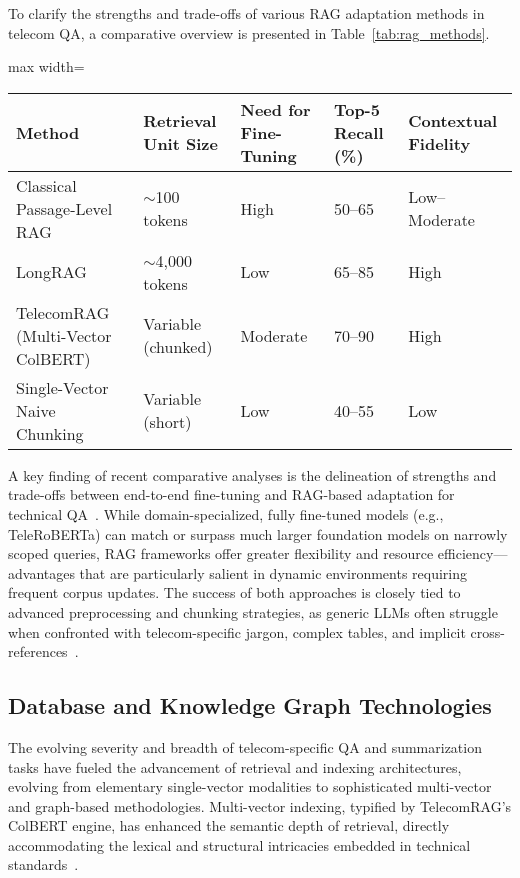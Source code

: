 \documentclass[sigconf]{acmart}
\begin{document}
To clarify the strengths and trade-offs of various RAG adaptation methods in telecom QA, a comparative overview is presented in Table~\ref{tab:rag_methods}.

\begin{table*}[htbp]
\centering
\caption{Comparative Properties of RAG Adaptation Strategies in Telecom Question Answering}
\label{tab:rag_methods}
\begin{adjustbox}{max width=\textwidth}
\begin{tabular}{lllll}
\toprule
\textbf{Method} & \textbf{Retrieval Unit Size} & \textbf{Need for Fine-Tuning} & \textbf{Top-5 Recall (\%)} & \textbf{Contextual Fidelity} \\
\midrule
Classical Passage-Level RAG & \(\sim\)100 tokens & High & 50--65 & Low--Moderate \\
LongRAG & \(\sim\)4,000 tokens & Low & 65--85 & High \\
TelecomRAG (Multi-Vector ColBERT) & Variable (chunked) & Moderate & 70--90 & High \\
Single-Vector Naive Chunking & Variable (short) & Low & 40--55 & Low \\
\bottomrule
\end{tabular}
\end{adjustbox}
\end{table*}

A key finding of recent comparative analyses is the delineation of strengths and trade-offs between end-to-end fine-tuning and RAG-based adaptation for technical QA~\cite{ref22,ref26}. While domain-specialized, fully fine-tuned models (e.g., TeleRoBERTa) can match or surpass much larger foundation models on narrowly scoped queries, RAG frameworks offer greater flexibility and resource efficiency---advantages that are particularly salient in dynamic environments requiring frequent corpus updates. The success of both approaches is closely tied to advanced preprocessing and chunking strategies, as generic LLMs often struggle when confronted with telecom-specific jargon, complex tables, and implicit cross-references~\cite{ref22}.

\subsection{Database and Knowledge Graph Technologies}

The evolving severity and breadth of telecom-specific QA and summarization tasks have fueled the advancement of retrieval and indexing architectures, evolving from elementary single-vector modalities to sophisticated multi-vector and graph-based methodologies. Multi-vector indexing, typified by TelecomRAG's ColBERT engine, has enhanced the semantic depth of retrieval, directly accommodating the lexical and structural intricacies embedded in technical standards~\cite{ref20,ref21}.
\end{document}
